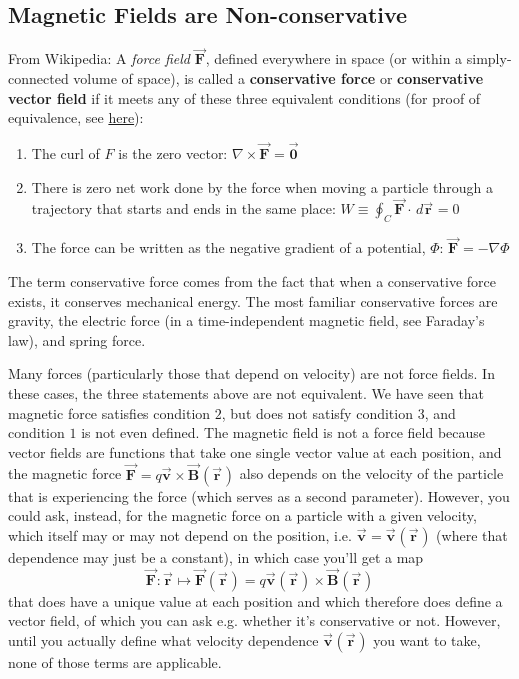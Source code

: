 \documentclass[11pt, letterpaper]{article}
\theoremstyle{definition}
\theoremstyle{remark}
\newcommand{\bv}[2][]{\bm{\vec{#2}_{#1}}}
\begin{document}
\subsection{Magnetic Fields are Non-conservative}
\label{subsec:non-conservative}
From Wikipedia: A \textit{force field} $\bv{F}$, defined everywhere in space (or within a simply-connected volume of space), is called a \textbf{conservative force} or \textbf{conservative vector field} if it meets any of these three equivalent conditions (for proof of equivalence, see \href{https://en.wikipedia.org/wiki/Conservative_force#Mathematical_description}{here}):
\begin{enumerate}
	\item The curl of $F$ is the zero vector: $\nabla\times\bv{F} = \bv{0}$
	\item There is zero net work done by the force when moving a particle through a trajectory that starts and ends in the same place: $W \equiv \oint_C \bv{F}\cdot\, d\bv{r} = 0$
	\item The force can be written as the negative gradient of a potential, $\Phi$: $\bv{F} = -\nabla\Phi$
\end{enumerate}
The term conservative force comes from the fact that when a conservative force exists, it conserves mechanical energy. The most familiar conservative forces are gravity, the electric force (in a time-independent magnetic field, see Faraday's law), and spring force.

Many forces (particularly those that depend on velocity) are not force fields. In these cases, the three statements above are not equivalent. We have seen that magnetic force satisfies condition $2$, but does not satisfy condition $3$, and condition $1$ is not even defined. The magnetic field is not a force field because vector fields are functions that take one single vector value at each position, and the magnetic force $\bv{F} = q\bv{v}\times\bv{B}(\bv{r})$ also depends on the velocity of the particle that is experiencing the force (which serves as a second parameter). However, you could ask, instead, for the magnetic force on a particle with a given velocity, which itself may or may not depend on the position, i.e. $\bv{v} = \bv{v}(\bv{r})$ (where that dependence may just be a constant), in which case you'll get a map \[\bv{F}\colon\bv{r}\mapsto\bv{F}(\bv{r}) = q\bv{v}(\bv{r})\times\bv{B}(\bv{r})\] that does have a unique value at each position and which therefore does define a vector field, of which you can ask e.g. whether it's conservative or not. However, until you actually define what velocity dependence $\bv{v}(\bv{r})$ you want to take, none of those terms are applicable.
\end{document}
